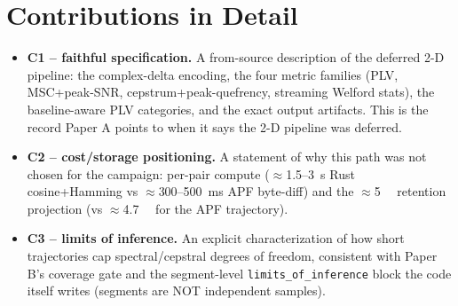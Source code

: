 \documentclass[conference]{IEEEtran}
\begin{document}
\section{Contributions in Detail}
\label{sec:contrib}
\begin{itemize}
  \item \textbf{C1 -- faithful specification.} A from-source description of the
        deferred 2-D pipeline: the complex-delta encoding, the four metric
        families (PLV, MSC+peak-SNR, cepstrum+peak-quefrency, streaming
        Welford stats), the baseline-aware PLV categories, and the exact output
        artifacts. This is the record Paper A points to when it says the 2-D
        pipeline was deferred.
  \item \textbf{C2 -- cost/storage positioning.} A statement of why this path
        was not chosen for the campaign: per-pair compute
        ($\approx$\SI{1.5}{}--\SI{3}{\second} Rust cosine+Hamming vs
        $\approx$\SI{300}{}--\SI{500}{\milli\second} APF byte-diff) and the
        $\approx$\SI{5}{\tebi\byte} retention projection (vs
        $\approx$\SI{4.7}{\mebi\byte} for the APF trajectory).
  \item \textbf{C3 -- limits of inference.} An explicit characterization of how
        short trajectories cap spectral/cepstral degrees of freedom, consistent
        with Paper B's coverage gate and the segment-level
        \texttt{limits\_of\_inference} block the code itself writes (segments
        are NOT independent samples).
\end{itemize}

\end{document}
